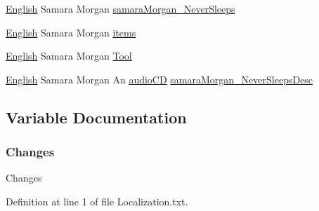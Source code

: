 \begin{DoxyCompactItemize}
\item 
\mbox{\hyperlink{_sphere_i_i_01_winter_01_project_2_config_2_localization_8txt_ad896b63205779b1b09e86d941ce13976}{English}} Samara Morgan \mbox{\hyperlink{_the_01_restless_01_curse_2_config_2_localization_8txt_a9a46a47148ce30e2f09c946a4e9bd88a}{samara\+Morgan\+\_\+\+Never\+Sleeps}}
\item 
\mbox{\hyperlink{_sphere_i_i_01_winter_01_project_2_config_2_localization_8txt_ad896b63205779b1b09e86d941ce13976}{English}} Samara Morgan \mbox{\hyperlink{_the_01_restless_01_curse_2_config_2_localization_8txt_ac9f63106d69e66a57567394d6c03cba2}{items}}
\item 
\mbox{\hyperlink{_sphere_i_i_01_winter_01_project_2_config_2_localization_8txt_ad896b63205779b1b09e86d941ce13976}{English}} Samara Morgan \mbox{\hyperlink{_the_01_restless_01_curse_2_config_2_localization_8txt_a5bc3eed766fdcc36e0065707852593ac}{Tool}}
\item 
\mbox{\hyperlink{_sphere_i_i_01_winter_01_project_2_config_2_localization_8txt_ad896b63205779b1b09e86d941ce13976}{English}} Samara Morgan An \mbox{\hyperlink{_sphere_i_i_01_music_01_boxes_2_config_2_localization_8txt_ae0a4281bb52a78c638f75d315de5da12}{audio\+CD}} \mbox{\hyperlink{_the_01_restless_01_curse_2_config_2_localization_8txt_ab80fa8fe6da47f7bd0f02427da5f36c8}{samara\+Morgan\+\_\+\+Never\+Sleeps\+Desc}}
\end{DoxyCompactItemize}


\subsection{Variable Documentation}
\mbox{\label{_the_01_restless_01_curse_2_config_2_localization_8txt_aada75e543d2eadaa69533d17cac8bd9a}} 
\subsubsection{\texorpdfstring{Changes}{Changes}}
{\footnotesize\ttfamily Changes}



Definition at line 1 of file Localization.\+txt.

\mbox{\label{_the_01_restless_01_curse_2_config_2_localization_8txt_abbebfae2c8b3c06e3115e79965277840}} 
